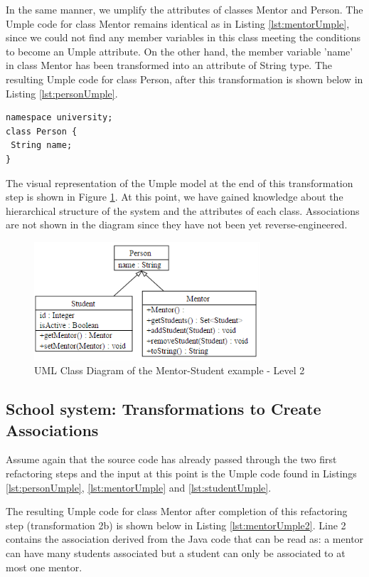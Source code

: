 In the same manner, we umplify the attributes of classes Mentor and Person.
The Umple code for class Mentor remains identical as in Listing \ref{lst:mentorUmple}, since we could not find any member variables in this class meeting the conditions to become an Umple attribute. On the other hand, the member variable 'name' in class Mentor has been transformed into an attribute of String type. The resulting Umple code for class Person, after this transformation is shown below in Listing \ref{lst:personUmple}.

\begin{lstlisting}[style=UmpleOut,caption=Person.ump,label=lst:personUmple]
namespace university;
class Person {
 String name;
}
\end{lstlisting}

The visual representation of the Umple model at the end of this transformation step is shown in Figure \ref{fig:Example1a2}. At this point, we have gained knowledge about the hierarchical structure of the system and the attributes of each class. Associations are not shown in the diagram since they have not been yet reverse-engineered.

\begin{figure}[h]
\centering
\includegraphics[width=0.75\textwidth]{Figures/Example1a2.png} 
\caption{UML Class Diagram of the Mentor-Student example - Level 2}
\label{fig:Example1a2}
\end{figure}

\subsection{School system: Transformations to Create Associations}

Assume again that the source code has already passed through the two first refactoring steps and the input at this point is the Umple code found in Listings \ref{lst:personUmple}, \ref{lst:mentorUmple} and \ref{lst:studentUmple}.

The resulting Umple code for class Mentor after completion of this refactoring step (transformation 2b) is shown below in Listing \ref{lst:mentorUmple2}. Line 2 contains the association derived from the Java code that can be read as: a mentor can have many students associated but a student can only be associated to at most one mentor. 

